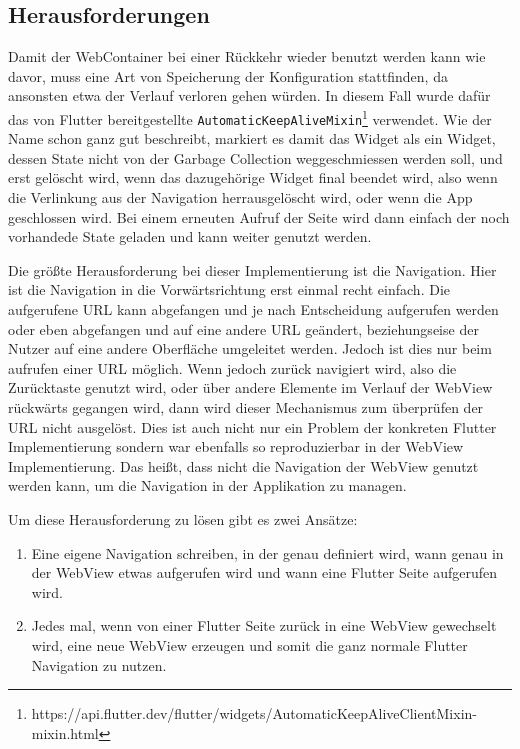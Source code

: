 \subsection{Herausforderungen}
Damit der WebContainer bei einer Rückkehr wieder benutzt werden kann wie davor, muss eine Art von Speicherung der Konfiguration stattfinden, da ansonsten etwa der Verlauf verloren gehen würden. In diesem Fall wurde dafür das von Flutter bereitgestellte \verb|AutomaticKeepAliveMixin|\footnote{https://api.flutter.dev/flutter/widgets/AutomaticKeepAliveClientMixin-mixin.html} verwendet. Wie der Name schon ganz gut beschreibt, markiert es damit das Widget als ein Widget, dessen State nicht von der Garbage Collection weggeschmiessen werden soll, und erst gelöscht wird, wenn das dazugehörige Widget final beendet wird, also wenn die Verlinkung aus der Navigation herrausgelöscht wird, oder wenn die App geschlossen wird. Bei einem erneuten Aufruf der Seite wird dann einfach der noch vorhandede State geladen und kann weiter genutzt werden.

Die größte Herausforderung bei dieser Implementierung ist die Navigation.
Hier ist die Navigation in die Vorwärtsrichtung erst einmal recht einfach. Die aufgerufene URL kann abgefangen und je nach Entscheidung aufgerufen werden oder eben abgefangen und auf eine andere URL geändert, beziehungseise der Nutzer auf eine andere Oberfläche umgeleitet werden. Jedoch ist dies nur beim aufrufen einer URL möglich. Wenn jedoch zurück navigiert wird, also die Zurücktaste genutzt wird, oder über andere Elemente im Verlauf der WebView rückwärts gegangen wird, dann wird dieser Mechanismus zum überprüfen der URL nicht ausgelöst. Dies ist auch nicht nur ein Problem der konkreten Flutter Implementierung sondern war ebenfalls so reproduzierbar in der WebView Implementierung. Das heißt, dass nicht die Navigation der WebView genutzt werden kann, um die Navigation in der Applikation zu managen.

Um diese Herausforderung zu lösen gibt es zwei Ansätze:
\begin{enumerate}
    \item Eine eigene Navigation schreiben, in der genau definiert wird, wann genau in der WebView etwas aufgerufen wird und wann eine Flutter Seite aufgerufen wird. 
    \item Jedes mal, wenn von einer Flutter Seite zurück in eine WebView gewechselt wird, eine neue WebView erzeugen und somit die ganz normale Flutter Navigation zu nutzen. 
\end{enumerate}

